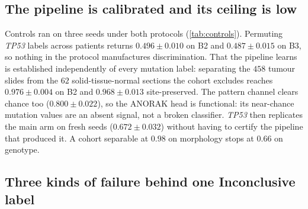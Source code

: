 \begin{table}[htbp]
\centering

\caption{\textbf{Every contrast the regime rule reads, with its
interval.} For each gene and outer protocol, the four between-condition
contrasts of the noise-aware rule (Methods): \piabmil{}$-$B2 decides
additive complementarity (ii-a); \fcmil{}$-$B2 together with
\piabmil{}$-$B2 must fall inside $\pm0.02$ for an equivalence read of
regime (i) or (iii); \fcmil{}$-$\piabmil{} decides the non-additive
sub-form (ii-b); and B3$-$B2 measures what the vocabulary omits. Each
cell gives the pooled out-of-fold point contrast, its $95\%$
hierarchical-bootstrap interval over seeds and patients ($2{,}000$
draws; site-clustered in \textbf{b}), and the number of the five seeds
on which the point contrast is positive. Bold marks an interval
excluding zero; a superscript $\approx$ would mark an interval inside
the $\pm0.02$ equivalence margin, and no cell earns one. Of $48$
contrasts, five exclude zero and all five are B3$-$B2; none of the $36$
fusion contrasts does, and none is equivalent to zero, which is why
every LUAD regime read is reported as directional and unadjudicated.
Generated from the same bootstrap output as the B3$-$B2 rows of
\cref{tab:mutation_luad_resultssec}.}
\label{tab:luad_contrasts}
\end{table}

\subsection*{The pipeline is calibrated and its ceiling is low}

Controls ran on three seeds under both protocols
(\cref{tab:controls}). Permuting
\textit{TP53} labels across patients returns $0.496\pm0.010$ on B2 and
$0.487\pm0.015$ on B3, so nothing in the protocol manufactures
discrimination. That the pipeline learns is established independently of
every mutation label: separating the $458$ tumour slides from the $62$
solid-tissue-normal sections the cohort excludes reaches
$0.976\pm0.004$ on B2 and $0.968\pm0.013$ site-preserved. The pattern
channel clears chance too ($0.800\pm0.022$), so the ANORAK head is
functional: its near-chance mutation values are an absent signal, not
a broken classifier. \textit{TP53} then replicates the main arm on fresh
seeds ($0.672\pm0.032$) without having to certify the pipeline that
produced it. A cohort separable at $0.98$ on morphology stops at $0.66$
on genotype.

\subsection*{Three kinds of failure behind one Inconclusive label}

